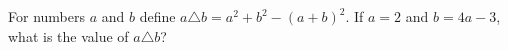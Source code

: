 For numbers $a$ and $b$ define $a\triangle b=a^2+b^2-(a+b)^2$. If $a=2$ and $b=4a-3$, what is the value of $a\triangle b$?

